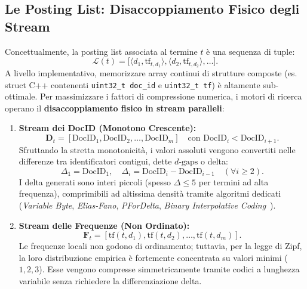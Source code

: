 \subsection{Le Posting List: Disaccoppiamento Fisico degli Stream}
Concettualmente, la posting list associata al termine $t$ \`e una sequenza di tuple:
\begin{equation}
\mathcal{L}(t) = \big[ \langle d_1, \text{tf}_{t,d_1} \rangle, \langle d_2, \text{tf}_{t,d_2} \rangle, \dots \big].
\end{equation}
A livello implementativo, memorizzare array continui di strutture composte (es. struct C++ contenenti \texttt{uint32\_t doc\_id} e \texttt{uint32\_t tf}) \`e altamente sub-ottimale. Per massimizzare i fattori di compressione numerica, i motori di ricerca operano il \textbf{disaccoppiamento fisico in stream paralleli}:

\begin{enumerate}
    \item \textbf{Stream dei DocID (Monotono Crescente):}
    \begin{equation}
    \mathbf{D}_t = [\text{DocID}_1, \text{DocID}_2, \dots, \text{DocID}_m] \quad \text{con } \text{DocID}_i < \text{DocID}_{i+1}.
    \end{equation}
    Sfruttando la stretta monotonicit\`a, i valori assoluti vengono convertiti nelle differenze tra identificatori contigui, dette \textbf{$d\text{-gaps}$} o delta:
    \begin{equation}
    \Delta_1 = \text{DocID}_1, \quad \Delta_i = \text{DocID}_i - \text{DocID}_{i-1} \quad (\forall i \ge 2).
    \end{equation}
    I delta generati sono interi piccoli (spesso $\Delta \le 5$ per termini ad alta frequenza), comprimibili ad altissima densit\`a tramite algoritmi dedicati (\textit{Variable Byte}, \textit{Elias-Fano}, \textit{PForDelta}, \textit{Binary Interpolative Coding}~\cite{moffat2000}).
    
    \item \textbf{Stream delle Frequenze (Non Ordinato):}
    \begin{equation}
    \mathbf{F}_t = [\text{tf}(t, d_1), \text{tf}(t, d_2), \dots, \text{tf}(t, d_m)].
    \end{equation}
    Le frequenze locali non godono di ordinamento; tuttavia, per la legge di Zipf, la loro distribuzione empirica \`e fortemente concentrata su valori minimi ($1, 2, 3$). Esse vengono compresse simmetricamente tramite codici a lunghezza variabile senza richiedere la differenziazione delta.
\end{enumerate}

